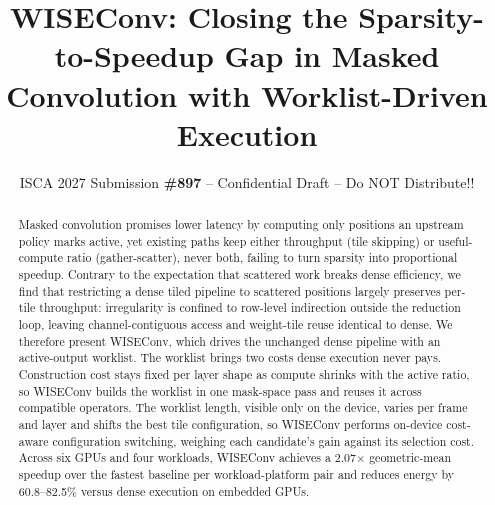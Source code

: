 \documentclass[sigconf, screen, review]{acmart}
\newcommand{\iscasubmissionnumber}{897}
\newcommand{\sysname}{\mbox{WISEConv}\xspace}
\begin{document}
\title{\sysname: Closing the Sparsity-to-Speedup Gap in Masked Convolution with Worklist-Driven Execution}
\author{ISCA 2027 Submission
  \textbf{\#\iscasubmissionnumber} -- Confidential Draft -- Do NOT Distribute!!}
\renewcommand{\shortauthors}{ISCA 2027 Submission \#\iscasubmissionnumber}

\begin{abstract}
Masked convolution promises lower latency by computing only
positions an upstream policy marks active, yet existing paths keep either
throughput (tile skipping) or useful-compute ratio (gather-scatter), never
both, failing to turn sparsity into proportional speedup.
Contrary to the expectation that scattered work breaks dense efficiency, we
find that restricting a dense tiled pipeline to scattered positions
largely preserves per-tile throughput: irregularity is confined to row-level
indirection outside the reduction loop, leaving channel-contiguous access and
weight-tile reuse identical to dense. We therefore present
\sysname, which drives the unchanged dense pipeline with an active-output
worklist. The worklist brings two costs
dense execution never pays. Construction cost stays fixed per layer shape as
compute shrinks with the active ratio, so \sysname builds the worklist in one
mask-space pass and reuses it across compatible operators. The worklist length, visible only on
the device, varies per frame and layer and shifts the best tile configuration,
so \sysname performs on-device cost-aware configuration switching,
weighing each
candidate's gain against its selection cost. Across six GPUs and four workloads,
\sysname achieves a 2.07$\times$ geometric-mean speedup over the
fastest baseline per workload-platform pair and reduces energy by
60.8--82.5\% versus dense execution on embedded GPUs.
\end{abstract}


\maketitle








% 






\end{document}
